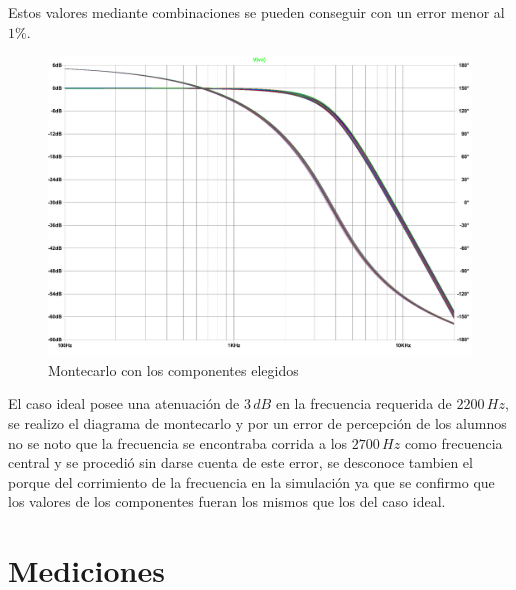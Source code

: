 	Estos valores mediante combinaciones se pueden conseguir con un error menor al $1 \%$.

\begin{figure}[H]
	\centering
	\includegraphics[scale=0.5]{../Ex1/Informe/montecarlobesselMAL.pdf}
	\caption{Montecarlo con los componentes elegidos}
	\label{fig:montecarlobessel}
\end{figure}

	El caso ideal posee una atenuación de $3 \, dB$ en la frecuencia requerida de $2200 \, Hz$, se realizo el diagrama de montecarlo y por un error de percepción de los alumnos no se noto que la frecuencia se encontraba corrida a los $2700 \, Hz$ como frecuencia central y se procedió sin darse cuenta de este error, se desconoce tambien el porque del corrimiento de la frecuencia en la simulación ya que se confirmo que los valores de los componentes fueran los mismos que los del caso ideal.
\section{Mediciones}
	
